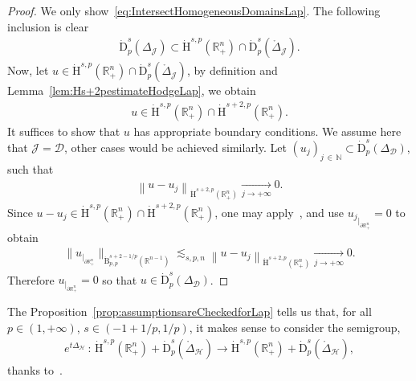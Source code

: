 \documentclass[10pt]{amsart}
\theoremstyle{definition}\newtheorem{defi}[theo]{Definition}\newtheorem{rema}[theo]{Remark}\newtheorem{exam}[theo]{Example}\newtheorem{exem}[theo]{Example}\newtheorem{nota}[theo]{Notation}
\newcommand{\bbR}{\mathbb{R}}
\newcommand{\bbN}{\mathbb{N}}
\newcommand{\rmH}{\mathrm{H}}%
\newcommand{\rmB}{\mathrm{B}}
\newcommand{\rmD}{\mathrm{D}}
\newcommand{\clH}{\mathcal{H}}
\newcommand{\clJ}{\mathcal{J}}
\newcommand{\clD}{\mathcal{D}}
\begin{document}
\begin{proof}
We only show~\eqref{eq:IntersectHomogeneousDomainsLap}. The following inclusion is clear
\begin{align*}
\dot{\rmD}^{s}_{p}({\Delta}_\clJ) \subset\dot{\rmH}^{s,p}\left(\bbR^n_+\right)\cap\dot{\rmD}^{s}_{p}\left(\mathring{\Delta}_\clJ\right) .
\end{align*}
Now, let $u\in \dot{\rmH}^{s,p}(\bbR^n_+)\cap\dot{\rmD}^{s}_{p}(\mathring{\Delta}_\clJ)$, by definition and Lemma~\ref{lem:Hs+2pestimateHodgeLap}, we obtain
\begin{align*}
u\in \dot{\rmH}^{s,p}\left(\bbR^n_+\right)\cap\dot{\rmH}^{s+2,p}\left(\bbR^n_+\right) .
\end{align*}
It suffices to show that $u$ has appropriate boundary conditions. We assume here that $\clJ=\clD$, other cases would be achieved similarly. Let $(u_j)_{j\,\in\,\bbN}\subset\dot{\rmD}^{s}_{p}(\Delta_\clD)$, such that
\begin{align*}
\left\| u-u_j \right\|_{\dot{\rmH}^{s+2,p}\left(\bbR^n_+\right)} \xrightarrow[j\rightarrow +\infty]{} 0 .
\end{align*}
Since $u-u_j\in \dot{\rmH}^{s,p}(\bbR^n_+)\cap\dot{\rmH}^{s+2,p}(\bbR^n_+)$, one may apply~\cite[Proposition~4.6]{Gaudin2022}, and use ${u_j}_{|_{\partial\bbR^n_+}}=0$ to obtain
\begin{align*}
\big\| u_{|_{\partial\bbR^n_+}}\big\|_{\dot{\rmB}^{s+2-{1/p}}_{p,p}\left(\bbR^{n-1}\right)}\lesssim_{s,p,n}\left\| u-u_j \right\|_{\dot{\rmH}^{s+2,p}\left(\bbR^n_+\right)} \xrightarrow[j\rightarrow +\infty]{} 0.
\end{align*}
Therefore $u_{|_{\partial\bbR^n_+}}=0$ so that $u\in\dot{\rmD}^{s}_{p}({\Delta}_\clD)$.
\end{proof}


The Proposition~\ref{prop:assumptionsareCheckedforLap} tells us that, for all $p\in(1,+\infty)$, $s\in(-1+1/p,1/p)$, it makes sense to consider the semigroup,
\begin{align*}
e^{t\Delta_\clH}\,:\,\dot{\rmH}^{s,p}\left(\bbR^n_+\right)+\dot{\rmD}^{s}_{p}\left(\mathring{\Delta}_\clH\right)\longrightarrow\dot{\rmH}^{s,p}\left(\bbR^n_+\right)+\dot{\rmD}^{s}_{p}\left(\mathring{\Delta}_\clH\right),
\end{align*}
thanks to~\cite[Chapter~2,~Section~1]{DanchinHieberMuchaTolk2020}.
\end{document}
